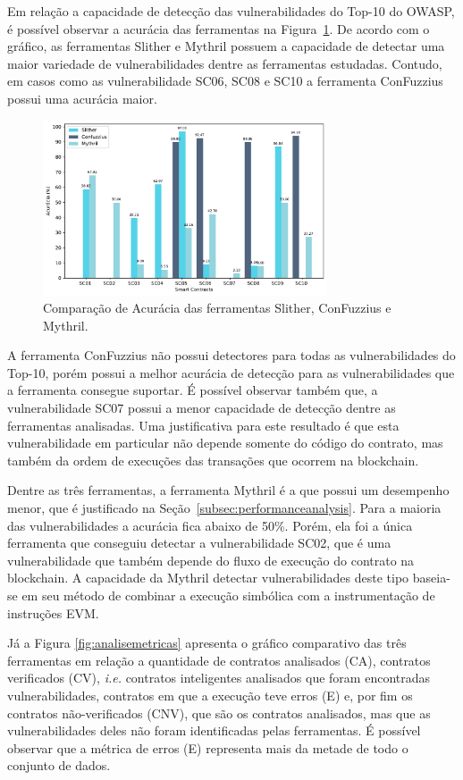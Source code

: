 \documentclass[12pt]{article}
\begin{document}
Em relação a capacidade de detecção das vulnerabilidades do Top-10 do OWASP, é possível observar a acurácia das ferramentas na Figura~\ref{fig:analiseacuracia}. De acordo com o gráfico, as ferramentas Slither e Mythril possuem a capacidade de detectar uma maior variedade de vulnerabilidades dentre as ferramentas estudadas. Contudo, em casos como as vulnerabilidade SC06, SC08 e SC10 a ferramenta ConFuzzius possui uma acurácia maior.

\begin{figure}[!ht]
    \centering
    \includegraphics[width=0.75\textwidth]{images/grafico_acuracia.pdf} 
      \caption{Comparação de Acurácia das ferramentas Slither, ConFuzzius e Mythril.}
    \label{fig:analiseacuracia}
\end{figure}

A ferramenta ConFuzzius não possui detectores para todas as vulnerabilidades do Top-10, porém possui a melhor acurácia de detecção para as vulnerabilidades que a ferramenta consegue suportar. É possível observar também que, a vulnerabilidade SC07 possui a menor capacidade de detecção dentre as ferramentas analisadas. Uma justificativa para este resultado é que esta vulnerabilidade em particular não depende somente do código do contrato, mas também da ordem de execuções das transações que ocorrem na blockchain.

Dentre as três ferramentas, a ferramenta Mythril é a que possui um desempenho menor, que é justificado na Seção~\ref{subsec:performanceanalysis}. Para a maioria das vulnerabilidades a acurácia fica abaixo de 50\%. Porém, ela foi a única ferramenta que conseguiu detectar a vulnerabilidade SC02, que é uma vulnerabilidade que também depende do fluxo de execução do contrato na blockchain. A capacidade da Mythril detectar vulnerabilidades deste tipo baseia-se em seu método de combinar a execução simbólica com a instrumentação de instruções EVM.

Já a Figura \ref{fig:analisemetricas} apresenta o gráfico comparativo das três ferramentas em relação a quantidade de contratos analisados (CA), contratos verificados (CV), \textit{i.e.} contratos inteligentes analisados que foram encontradas vulnerabilidades, contratos em que a execução teve erros (E) e, por fim os contratos não-verificados (CNV), que são os contratos analisados, mas que as vulnerabilidades deles não foram identificadas pelas ferramentas. É possível observar que a métrica de erros (E) representa mais da metade de todo o conjunto de dados.
\end{document}
